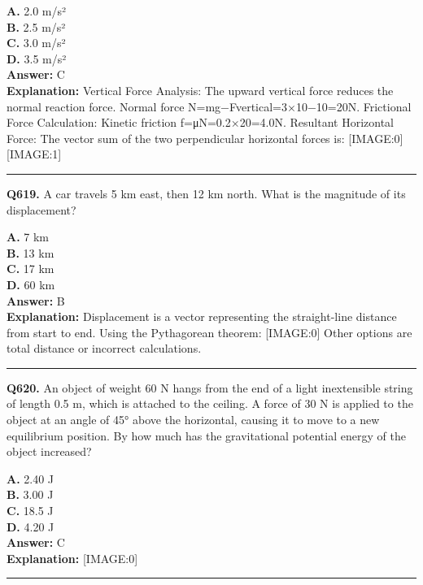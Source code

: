 \documentclass[12pt]{article}
\begin{document}
\textbf{A.} 2.0 m/s² \\
\textbf{B.} 2.5 m/s² \\
\textbf{C.} 3.0 m/s² \\
\textbf{D.} 3.5 m/s² \\

\textbf{Answer:} C \\
\textbf{Explanation:} Vertical Force Analysis:
The upward vertical force reduces the normal reaction force.
Normal force N=mg−Fvertical​=3×10−10=20N.
Frictional Force Calculation:
Kinetic friction f=μN=0.2×20=4.0N.
Resultant Horizontal Force:
The vector sum of the two perpendicular horizontal forces is:
[IMAGE:0]
[IMAGE:1]

\hrule
\vspace{1em}


\noindent
\textbf{Q619.} A car travels 5 km east, then 12 km north. What is the magnitude of its displacement?



\textbf{A.} 7 km \\
\textbf{B.} 13 km \\
\textbf{C.} 17 km \\
\textbf{D.} 60 km \\

\textbf{Answer:} B \\
\textbf{Explanation:} Displacement is a vector representing the straight-line distance from start to end. Using the Pythagorean theorem:
[IMAGE:0]
Other options are total distance or incorrect calculations.

\hrule
\vspace{1em}


\noindent
\textbf{Q620.} An object of weight 60 N hangs from the end of a light inextensible string of length 0.5 m, which is attached to the ceiling. A force of 30 N is applied to the object at an angle of 45° above the horizontal, causing it to move to a new equilibrium position. By how much has the gravitational potential energy of the object increased?



\textbf{A.} 2.40 J \\
\textbf{B.} 3.00 J \\
\textbf{C.} 18.5 J \\
\textbf{D.} 4.20 J \\

\textbf{Answer:} C \\
\textbf{Explanation:} [IMAGE:0]

\hrule
\vspace{1em}
\end{document}
